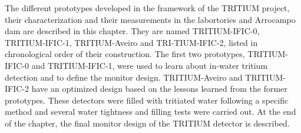 The different prototypes developed in the framework of the TRITIUM project, their characterization and their measurements in the labortories and Arrocampo dam are described in this chapter. They are named TRITIUM-IFIC-0, TRITIUM-IFIC-1, TRITIUM-Aveiro and TRI-TIUM-IFIC-2, listed in chronological order of their construction. The first two prototypes, TRITIUM-IFIC-0 and TRITIUM-IFIC-1, were used to learn about in-water tritium detection and to define the monitor design. TRITIUM-Aveiro and TRITIUM-IFIC-2 have an optimized design based on the lessons learned from the former prototypes. These detectors were filled with tritiated water following a specific method and several water tightness and filling tests were carried out. At the end of the chapter, the final monitor design of the TRITIUM detector is described.